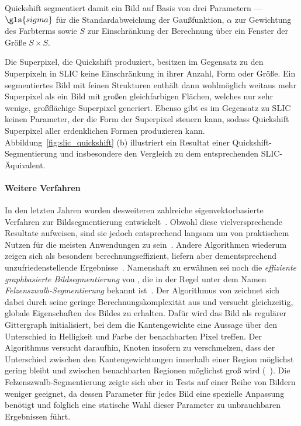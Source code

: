 Quickshift segmentiert damit ein Bild auf Basis von drei Parametern — $\gls{sigma}$ für die  Standardabweichung der Gaußfunktion, $\alpha$ zur Gewichtung des Farbterms sowie $S$ zur Einschränkung der Berechnung über ein Fenster der Größe $S \times S$.

Die Superpixel, die Quickshift produziert, besitzen im Gegensatz zu den Superpixeln in \gls{SLIC} keine Einschränkung in ihrer Anzahl, Form oder Größe.
Ein segmentiertes Bild mit feinen Strukturen enthält dann wohlmöglich weitaus mehr Superpixel als ein Bild mit großen gleichfarbigen Flächen, welches nur sehr wenige, großflächige Superpixel generiert.
Ebenso gibt es im Gegensatz zu \gls{SLIC} keinen Parameter, der die Form der Superpixel steuern kann, sodass Quickshift Superpixel aller erdenklichen Formen produzieren kann.
Abbildung~\ref{fig:slic_quickshift} (b) illustriert ein Resultat einer Quickshift-Segmentierung und insbesondere den Vergleich zu dem entsprechenden \gls{SLIC}-Äquivalent.

\paragraph{Weitere Verfahren}
\label{weitere_superpixel_verfahren}

In den letzten Jahren wurden desweiteren zahlreiche eigenvektorbasierte Verfahren zur Bildsegmentierung entwickelt~\cite{super, felzenszwalb}.
Obwohl diese vielversprechende Resultate aufweisen, sind sie jedoch entsprechend langsam um von praktischem Nutzen für die meisten Anwendungen zu sein~\cite{felzenszwalb}.
Andere Algorithmen wiederum zeigen sich als besonders berechnungseffizient, liefern aber dementsprechend unzufriedenstellende Ergebnisse~\cite{felzenszwalb}.
Namenshaft zu erwähnen sei noch die \emph{effiziente graphbasierte Bildsegmentierung} von \citeauthor{felzenszwalb}, die in der Regel unter dem Namen \emph{Felzenszwalb-Segmentierung} bekannt ist~\cite{felzenszwalb}.
Der Algorithmus von \citeauthor{felzenszwalb} zeichnet sich dabei durch seine geringe Berechnungskomplexität aus und versucht gleichzeitig, globale Eigenschaften des Bildes zu erhalten.
Dafür wird das Bild als regulärer Gittergraph initialisiert, bei dem die Kantengewichte eine Aussage über den Unterschied in Helligkeit und Farbe der benachbarten Pixel treffen.
Der Algorithmus versucht daraufhin, Knoten insofern zu verschmelzen, dass der Unterschied zwischen den Kantengewichtungen innerhalb einer Region möglichst gering bleibt und zwischen benachbarten Regionen möglichst groß wird (\vgl{}~\cite{felzenszwalb}).
Die Felzenszwalb-Segmentierung zeigte sich aber in Tests auf einer Reihe von Bildern weniger geeignet, da dessen Parameter für jedes Bild eine spezielle Anpassung benötigt und folglich eine statische Wahl dieser Parameter zu unbrauchbaren Ergebnissen führt.
